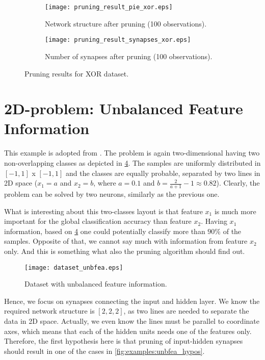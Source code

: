 \begin{figure}[H]
\centering
\begin{subfigure}{.4\textwidth}
  \centering
  \texttt{[image: pruning\_result\_pie\_xor.eps]}
  \caption{Network structure after pruning (100 observations).}
  \label{fig:examples:pie_xor}
\end{subfigure}
\begin{subfigure}{.4\textwidth}
  \centering
  \texttt{[image: pruning\_result\_synapses\_xor.eps]}
  \caption{Number of synapses after pruning (100 observations).}
  \label{fig:examples:result_synapses_xor}
\end{subfigure}
\caption{Pruning results for XOR dataset.}
\label{fig:examples:pruning_result_xor}
\end{figure}

\section{2D-problem: Unbalanced Feature Information} \label{sec:dataset_unbfea}
This example is adopted from \citep{karnin}. The problem is again two-dimensional having two non-overlapping classes as depicted in \cref{fig:examples:dataset_unbfea}. The samples are uniformly distributed in $ [-1, 1] $ x $ [-1, 1] $ and the classes are equally probable, separated by two lines in 2D space ($ x_1 = a $ and $ x_2 = b $, where $ a = 0.1 $ and $ b = \frac{2}{a+1} - 1 \approx 0.82 $). Clearly, the problem can be solved by two neurons, similarly as the previous one.

What is interesting about this two-classes layout is that feature $ x_1 $ is much more important for the global classification accuracy than feature $ x_2 $. Having $ x_1 $ information, based on \cref{fig:examples:dataset_unbfea} one could potentially classify more than $ 90\% $ of the samples. Opposite of that, we cannot say much with information from feature $ x_2 $ only. And this is something what also the pruning algorithm should find out.

\begin{figure}[H]
\centering
\texttt{[image: dataset\_unbfea.eps]}
\caption{Dataset with unbalanced feature information.}
\label{fig:examples:dataset_unbfea}
\end{figure}

Hence, we focus on synapses connecting the input and hidden layer. We know the required network structure is $ [2, 2, 2] $, as two lines are needed to separate the data in 2D space. Actually, we even know the lines must be parallel to coordinate axes, which means that each of the hidden units needs one of the features only. Therefore, the first hypothesis here is that pruning of input-hidden synapses should result in one of the cases in \cref{fig:examples:unbfea_hypos}.

